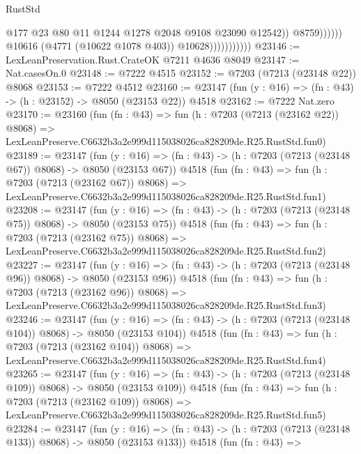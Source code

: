 \begin{lexlean}{RustStd}
\begin{coremodule}
                                          @177
                                          @23
                                          @80
                                          @11
                                          @1244
                                          @1278
                                          @2048
                                          @9108
                                          @23090
                                          @12542))
                                      @8759))))))
                          @10616
                          (@4771 (@10622 @1078 @403))
                          @10628)))))))))))
@23146 := LexLeanPreservation.Rust.CrateOK @7211 @4636 @8049
@23147 := Nat.casesOn.{0}
@23148 := @7222 @4515
@23152 := @7203 (@7213 (@23148 @22)) @8068
@23153 := @7222 @4512
@23160 := @23147 (fun (y : @16) => (fn : @43) -> (h : @23152) -> @8050 (@23153 @22)) @4518
@23162 := @7222 Nat.zero
@23170 := @23160
    (fun (fn : @43) =>
    fun (h : @7203 (@7213 (@23162 @22)) @8068) =>
    LexLeanPreserve.C6632b3a2e999d115038026ca828209de.R25.RustStd.fun0)
@23189 := @23147
    (fun (y : @16) => (fn : @43) -> (h : @7203 (@7213 (@23148 @67)) @8068) -> @8050 (@23153 @67))
    @4518
    (fun (fn : @43) =>
    fun (h : @7203 (@7213 (@23162 @67)) @8068) =>
    LexLeanPreserve.C6632b3a2e999d115038026ca828209de.R25.RustStd.fun1)
@23208 := @23147
    (fun (y : @16) => (fn : @43) -> (h : @7203 (@7213 (@23148 @75)) @8068) -> @8050 (@23153 @75))
    @4518
    (fun (fn : @43) =>
    fun (h : @7203 (@7213 (@23162 @75)) @8068) =>
    LexLeanPreserve.C6632b3a2e999d115038026ca828209de.R25.RustStd.fun2)
@23227 := @23147
    (fun (y : @16) => (fn : @43) -> (h : @7203 (@7213 (@23148 @96)) @8068) -> @8050 (@23153 @96))
    @4518
    (fun (fn : @43) =>
    fun (h : @7203 (@7213 (@23162 @96)) @8068) =>
    LexLeanPreserve.C6632b3a2e999d115038026ca828209de.R25.RustStd.fun3)
@23246 := @23147
    (fun (y : @16) => (fn : @43) -> (h : @7203 (@7213 (@23148 @104)) @8068) -> @8050 (@23153 @104))
    @4518
    (fun (fn : @43) =>
    fun (h : @7203 (@7213 (@23162 @104)) @8068) =>
    LexLeanPreserve.C6632b3a2e999d115038026ca828209de.R25.RustStd.fun4)
@23265 := @23147
    (fun (y : @16) => (fn : @43) -> (h : @7203 (@7213 (@23148 @109)) @8068) -> @8050 (@23153 @109))
    @4518
    (fun (fn : @43) =>
    fun (h : @7203 (@7213 (@23162 @109)) @8068) =>
    LexLeanPreserve.C6632b3a2e999d115038026ca828209de.R25.RustStd.fun5)
@23284 := @23147
    (fun (y : @16) => (fn : @43) -> (h : @7203 (@7213 (@23148 @133)) @8068) -> @8050 (@23153 @133))
    @4518
    (fun (fn : @43) =>

\end{coremodule}
\end{lexlean}
